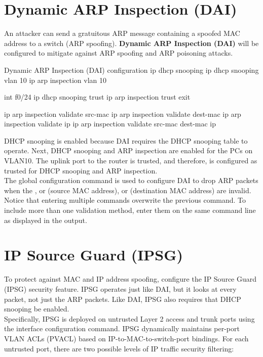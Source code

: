 \section{Dynamic ARP Inspection (DAI)}

An attacker can send a gratuitous ARP message containing a spoofed MAC address to a switch (ARP spoofing). \textbf{Dynamic ARP Inspection (DAI)} will be configured to mitigate against ARP spoofing and ARP poisoning attacks.

\begin{sexylisting}{Dynamic ARP Inspection (DAI) configuration}
ip dhcp snooping
ip dhcp snooping vlan 10
ip arp inspection vlan 10

int f0/24
ip dhcp snooping trust
ip arp inspection trust
exit

ip arp inspection validate src-mac
ip arp inspection validate dest-mac
ip arp inspection validate ip
ip arp inspection validate src-mac dest-mac ip
\end{sexylisting}

DHCP snooping is enabled because DAI requires the DHCP snooping table to operate. Next, DHCP snooping and ARP inspection are enabled for the PCs on VLAN10. The uplink port to the router is trusted, and therefore, is configured as trusted for DHCP snooping and ARP inspection.\\

The  global configuration command is used to configure DAI to drop ARP packets when the , or  (source MAC address), or  (destination MAC address) are invalid. Notice that entering multiple  commands overwrite the previous command. To include more than one validation method, enter them on the same command line as displayed in the output.

\section{IP Source Guard (IPSG)}

To protect against MAC and IP address spoofing, configure the IP Source Guard (IPSG) security feature. IPSG operates just like DAI, but it looks at every packet, not just the ARP packets. Like DAI, IPSG also requires that DHCP snooping be enabled.\\

Specifically, IPSG is deployed on untrusted Layer 2 access and trunk ports using the  interface configuration command. IPSG dynamically maintains per-port VLAN ACLs (PVACL) based on IP-to-MAC-to-switch-port bindings. For each untrusted port, there are two possible levels of IP traffic security filtering:

